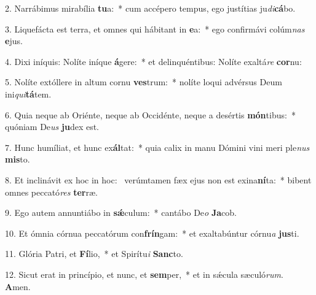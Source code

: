 2. Narrábimus mirabília \textbf{tu}a:~*  cum accépero tempus, ego justítias ju\textit{di}\textbf{cá}bo.\

3. Liquefácta est terra, et omnes qui hábitant in \textbf{e}a:~*  ego confirmávi colúm\textit{nas} \textbf{e}jus.\

4. Dixi iníquis: Nolíte iníque \textbf{á}gere:~*  et delinquéntibus: Nolíte exaltá\textit{re} \textbf{cor}nu:\

5. Nolíte extóllere in altum cornu \textbf{ves}trum:~*  nolíte loqui advérsus Deum ini\textit{qui}\textbf{tá}tem.\

6. Quia neque ab Oriénte, neque ab Occidénte, neque a desértis \textbf{món}tibus:~*  quóniam De\textit{us} \textbf{ju}dex est.\

7. Hunc humíliat, et hunc ex\textbf{ál}tat:~*  quia calix in manu Dómini vini meri ple\textit{nus} \textbf{mis}to.\

8. Et inclinávit ex hoc in hoc: \dag\  verúmtamen fæx ejus non est exina\textbf{ní}ta:~*  bibent omnes peccató\textit{res} \textbf{ter}ræ.\

9. Ego autem annuntiábo in \textbf{sǽ}culum:~*  cantábo De\textit{o} \textbf{Ja}cob.\

10. Et ómnia córnua peccatórum con\textbf{frín}gam:~*  et exaltabúntur córnu\textit{a} \textbf{jus}ti.\

11. Glória Patri, et \textbf{Fí}lio,~*  et Spirítu\textit{i} \textbf{Sanc}to.\

12. Sicut erat in princípio, et nunc, et \textbf{sem}per,~*  et in sǽcula sæculó\textit{rum}. \textbf{A}men.\

